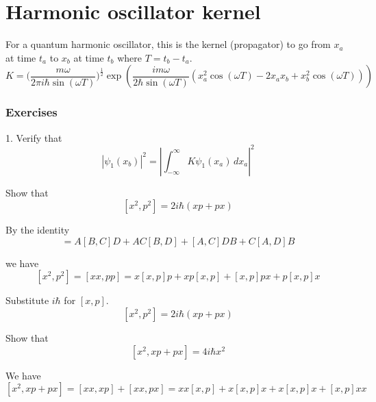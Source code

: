 

\section*{Harmonic oscillator kernel}

For a quantum harmonic oscillator, this is the kernel (propagator) to go from $x_a$ at time $t_a$
to $x_b$ at time $t_b$ where $T=t_b-t_a$.
\begin{equation*}
K=\biggl(\frac{m\omega}{2\pi i\hbar\sin(\omega T)}\biggr)^\frac{1}{2}
\exp\left(\frac{im\omega}{2\hbar\sin(\omega T)}
\left(
x_a^2\cos(\omega T)-2x_ax_b+x_b^2\cos(\omega T)
\right)
\right)
\end{equation*}

\subsubsection*{Exercises}

1. Verify that
\begin{equation*}
\left|\psi_1(x_b)\right|^2=\left|\int_{-\infty}^\infty K\psi_1(x_a)\,dx_a\right|^2
\end{equation*}




Show that
\begin{equation*}
\left[x^2,p^2\right]=2i\hbar(xp+px)
\tag{1}
\end{equation*}

By the identity
\begin{equation*}
[AB,CD]=A[B,C]D+AC[B,D]+[A,C]DB+C[A,D]B
\end{equation*}

we have
\begin{equation*}
\left[x^2,p^2\right]=[xx,pp]=x[x,p]p+xp[x,p]+[x,p]px+p[x,p]x
\end{equation*}

Substitute $i\hbar$ for $[x,p]$.
\begin{equation*}
\left[x^2,p^2\right]=2i\hbar(xp+px)
\end{equation*}

Show that
\begin{equation*}
\left[x^2,xp+px\right]=4i\hbar x^2
\tag{2}
\end{equation*}

We have
\begin{equation*}
\left[x^2,xp+px\right]=[xx,xp]+[xx,px]
=xx[x,p]+x[x,p]x+x[x,p]x+[x,p]xx
\end{equation*}

